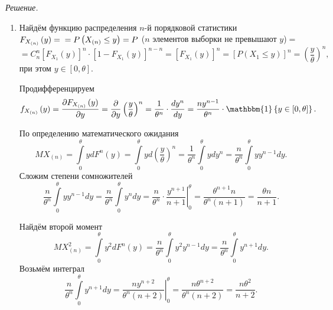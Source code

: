 \textit{Решение.}
\begin{enumerate}[label=\alph*)]
\item Найдём функцию распределения $n$-й порядковой статистики
$F_{X_{ \left( n \right) }} \left( y \right) = \\
  = P \left( X_{ \left( n \right) } \leq y \right) =
  P$ ($n$ элементов выборки не превышают $y$)$=$
  $$= C_n^n \left[ F_{X_1} \left( y \right) \right]^n \cdot
  \left[ 1 - F_{X_1} \left( y \right) \right]^{n - n} =
  \left[ F_{X_1} \left( y \right) \right]^n =
  \left[ P \left( X_1 \leq y \right) \right]^n =
  \left( \frac{y}{ \theta } \right)^n,$$
при этом $y \in \left[ 0, \theta \right] $.

Продифференцируем
$$f_{X_{ \left( n \right) }} \left( y \right) =
  \frac{ \partial F_{X_{ \left( n \right) }} \left( y \right) }{ \partial y} =
  \frac{ \partial }{ \partial y} \left( \frac{y}{ \theta } \right)^n =
  \frac{1}{ \theta^n} \cdot \frac{dy^n}{dy} =
  \frac{ny^{n - 1}}{ \theta^n} \cdot \mathbbm{1} \left\{ y \in \left[ 0, \theta \right] \right\}.$$

По определению математического ожидания
$$MX_{ \left( n \right) } =
  \int \limits_0^{ \theta } ydF^n \left( y \right) =
  \int \limits_0^{ \theta } yd \left( \frac{y}{ \theta } \right)^n =
  \frac{1}{ \theta^n} \int \limits_0^{ \theta } ydy^n =
  \frac{n}{ \theta^n} \int \limits_0^{ \theta } yy^{n - 1} dy.$$
Сложим степени сомножителей
$$ \frac{n}{ \theta^n} \int \limits_0^{ \theta } yy^{n - 1} dy =
  \frac{n}{ \theta^n} \int \limits_0^{ \theta } y^n dy =
  \frac{n}{ \theta^n} \cdot \left. \frac{y^{n + 1}}{n + 1} \right|_0^{ \theta } =
  \frac{ \theta^{n + 1} n}{ \theta^n \left( n + 1 \right) } =
  \frac{ \theta n}{n + 1}.$$

Найдём второй момент
$$MX_{ \left( n \right) }^2 =
  \int \limits_0^{ \theta } y^2 dF^n \left( y \right) =
  \frac{n}{ \theta^n} \int \limits_0^{ \theta } y^2 y^{n - 1} dy =
  \frac{n}{ \theta^n} \int \limits_0^{ \theta } y^{n + 1} dy.$$
Возьмём интеграл
$$ \frac{n}{ \theta^n} \int \limits_0^{ \theta } y^{n + 1} dy =
  \left. \frac{ny^{n + 2}}{ \theta^n \left( n + 2 \right) } \right|_0^{ \theta } =
  \frac{n \theta^{n + 2}}{ \theta^n \left( n + 2 \right) } =
  \frac{n \theta^2}{n + 2}.$$


\end{enumerate}
